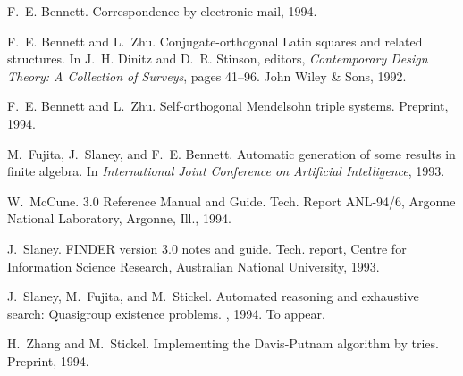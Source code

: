 
\nocite{qg-ijcai}


% 

\begin{thebibliography}{1}

F.~E. Bennett.
\newblock Correspondence by electronic mail, 1994.

F.~E. Bennett and L.~Zhu.
\newblock Conjugate-orthogonal Latin squares and related structures.
\newblock In J.~H. Dinitz and D.~R. Stinson, editors, {\em Contemporary Design
  Theory: A Collection of Surveys}, pages 41--96. John Wiley \& Sons, 1992.

F.~E. Bennett and L.~Zhu.
\newblock Self-orthogonal {M}endelsohn triple systems.
\newblock Preprint, 1994.

M.~Fujita, J.~Slaney, and F.~E. Bennett.
\newblock Automatic generation of some results in finite algebra.
\newblock In {\em International Joint Conference on Artificial Intelligence},
  1993.

W.~McCune.
 3.0 {R}eference {M}anual and {G}uide.
\newblock Tech. Report ANL-94/6, Argonne National Laboratory, Argonne, Ill.,
  1994.

J.~Slaney.
\newblock FINDER version 3.0 notes and guide.
\newblock Tech. report, Centre for Information Science Research, Australian
  National University, 1993.

J.~Slaney, M.~Fujita, and M.~Stickel.
\newblock Automated reasoning and exhaustive search: Quasigroup existence
  problems.
, 1994.
\newblock To appear.

H.~Zhang and M.~Stickel.
\newblock Implementing the {D}avis-{P}utnam algorithm by tries.
\newblock Preprint, 1994.

\end{thebibliography}




